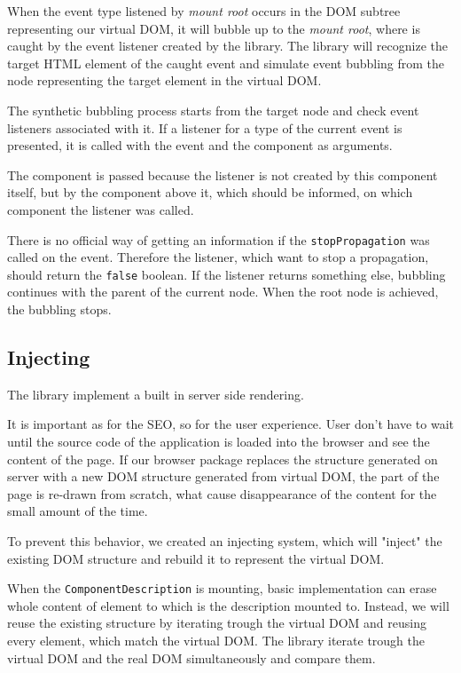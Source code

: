 \documentclass[oneside, 12pt]{book}
\begin{document}
      When the event type listened by \textit{mount root} occurs in the DOM subtree representing our virtual DOM, 
      it will bubble up to the \textit{mount root}, where is caught by the event listener created by the \tiles library. 
      The \tiles library will recognize the target HTML element of the caught event 
      and simulate event bubbling from the node representing the target element in the virtual DOM.

      The synthetic bubbling process starts from the target node and check event listeners associated with it.
      If a listener for a type of the current event is presented, it is called with the event and the component as arguments. 

      The component is passed because the listener is not created by this component itself, 
      but by the component above it, which should be informed, on which component the listener was called.

      There is no official way of getting an information if the \texttt{stopPropagation} was called on the event.
      Therefore the listener, which want to stop a propagation, should return the \texttt{false} boolean.
      If the listener returns something else, bubbling continues with the parent of the current node.
      When the root node is achieved, the bubbling stops.

  \subsection{Injecting}\label{subsec:our-architecture-injecting}

    The \tiles library implement a built in server side rendering.

    It is important as for the SEO, so for the user experience. 
    User don't have to wait until the source code of the application is loaded into the browser and see the content of the page. 
    If our browser package replaces the structure generated on server with a new DOM structure 
    generated from virtual DOM, the part of the page is re-drawn from scratch,
    what cause disappearance of the content for the small amount of the time.

    To prevent this behavior, we created an injecting system, which will "inject" the existing DOM structure 
    and rebuild it to represent the virtual DOM.

    When the \texttt{ComponentDescription} is mounting, 
    basic implementation can erase whole content of element to which is the description mounted to.
    Instead, we will reuse the existing structure by iterating trough the virtual DOM and reusing every element, which match the virtual DOM. 
    The \tiles library iterate trough the virtual DOM and the real DOM simultaneously and compare them. 
\end{document}
